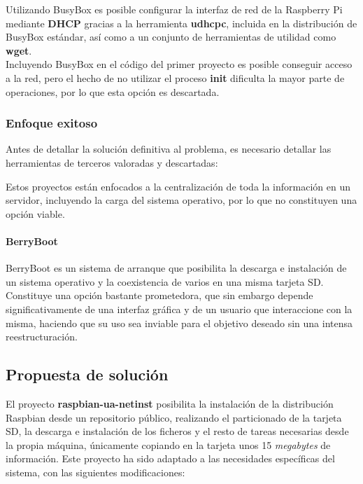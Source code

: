 \documentclass{article}
\begin{document}
Utilizando BusyBox es posible configurar la interfaz de red de la Raspberry Pi mediante \textbf{DHCP} gracias a la herramienta \textbf{udhcpc}, incluida en la distribución de BusyBox estándar, así como a un conjunto de herramientas de utilidad como \textbf{wget}.\\

Incluyendo BusyBox en el código del primer proyecto es posible conseguir acceso a la red, pero el hecho de no utilizar el proceso \textbf{init} dificulta la mayor parte de operaciones, por lo que esta opción es descartada.

\subsubsection{Enfoque exitoso}

Antes de detallar la solución definitiva al problema, es necesario detallar las herramientas de terceros valoradas y descartadas:


Estos proyectos\cite{raspiltsp, pinet} están enfocados a la centralización de toda la información en un servidor, incluyendo la carga del sistema operativo, por lo que no constituyen una opción viable.

\paragraph{BerryBoot}

BerryBoot\cite{berryboot} es un sistema de arranque que posibilita la descarga e instalación de un sistema operativo y la coexistencia de varios en una misma tarjeta SD. Constituye una opción bastante prometedora, que sin embargo depende significativamente de una interfaz gráfica y de un usuario que interaccione con la misma, haciendo que su uso sea inviable para el objetivo deseado sin una intensa reestructuración.

\subsection{Propuesta de solución}

El proyecto \textbf{raspbian-ua-netinst}\cite{raspbian-ua-netinst} posibilita la instalación de la distribución Raspbian desde un repositorio público, realizando el particionado de la tarjeta SD, la descarga e instalación de los ficheros y el resto de tareas necesarias desde la propia máquina, únicamente copiando en la tarjeta unos 15 \textit{megabytes} de información. Este proyecto ha sido adaptado a las necesidades específicas del sistema, con las siguientes modificaciones:
\end{document}
